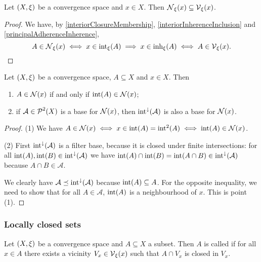 \begin{lemma}
Let $\sSet{X,\xi}$ be a convergence space and $x\in X$. Then $\operatorname{\mathcal{N}}_\xi(x) \subseteq \operatorname{\mathcal{V}}_\xi(x)$.
\end{lemma}
\begin{proof}
We have, by \ref{interiorClosureMembership}, \ref{interiorInherenceInclusion} and \ref{principalAdherenceInherence},
\[ A \in \operatorname{\mathcal{N}}_\xi(x) \iff x\in \operatorname{int}_\xi(A) \implies x\in \operatorname{inh}_\xi(A) \iff A\in\operatorname{\mathcal{V}}_\xi(x). \]
\end{proof}

\begin{lemma} \label{interiorModificationNeighbourhoods}
Let $\sSet{X,\xi}$ be a convergence space, $A\subseteq X$ and $x\in X$. Then
\begin{enumerate}
\item $A\in\operatorname{\mathcal{N}}(x)$ \textup{if and only if} $\operatorname{int}(A)\in\operatorname{\mathcal{N}}(x)$;
\item if $\mathcal{A}\in\operatorname{\mathcal{P}}^2(X)$ is a base for $\operatorname{\mathcal{N}}(x)$, then $\operatorname{int}^{\downarrow}(\mathcal{A})$ is also a base for $\operatorname{\mathcal{N}}(x)$.
\end{enumerate}
\end{lemma}
\begin{proof}
(1) We have $A\in\operatorname{\mathcal{N}}(x) \iff x\in \operatorname{int}(A) = \operatorname{int}^2(A) \iff \operatorname{int}(A) \in \operatorname{\mathcal{N}}(x)$.

(2) First $\operatorname{int}^{\downarrow}(\mathcal{A})$ is a filter base, because it is closed under finite intersections: for all $\operatorname{int}(A),\operatorname{int}(B)\in \operatorname{int}^{\downarrow}(\mathcal{A})$ we have $\operatorname{int}(A)\cap\operatorname{int}(B) = \operatorname{int}(A\cap B) \in \operatorname{int}^{\downarrow}(\mathcal{A})$ because $A\cap B \in \mathcal{A}$.

We clearly have $\mathcal{A} \preceq \operatorname{int}^{\downarrow}(\mathcal{A})$ because $\operatorname{int}(A) \subseteq A$. For the opposite inequality, we need to show that for all $A\in \mathcal{A}$, $\operatorname{int}(A)$ is a neighbourhood of $x$. This is point (1).
\end{proof}

\subsubsection{Locally closed sets}
\begin{definition}
Let $\sSet{X,\xi}$ be a convergence space and $A\subseteq X$ a subset. Then $A$ is called  if for all $x\in A$ there exists a vicinity $V_x\in\operatorname{\mathcal{V}}_\xi(x)$ such that $A\cap V_x$ is closed in $V_x$.
\end{definition}

